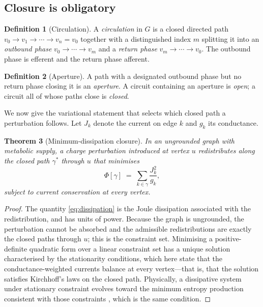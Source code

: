 \documentclass[11pt,twocolumn,a4paper]{article}
\theoremstyle{thmstyle}
\newtheorem{theorem}{Theorem}[section]
\theoremstyle{definition}
\newtheorem{definition}[theorem]{Definition}
\theoremstyle{remark}
\newcommand{\Gph}{G}
\begin{document}
\subsection{Closure is obligatory}

\begin{definition}[Circulation]
\label{def:circulation}
A \emph{circulation} in $\Gph$ is a closed directed path
$v_0\to v_1\to\cdots\to v_n=v_0$ together with a distinguished index $m$
splitting it into an \emph{outbound phase} $v_0\to\cdots\to v_m$ and a
\emph{return phase} $v_m\to\cdots\to v_0$. The outbound phase is efferent and
the return phase afferent.
\end{definition}

\begin{definition}[Aperture]
\label{def:aperture}
A path with a designated outbound phase but no return phase closing it is an
\emph{aperture}. A circuit containing an aperture is \emph{open}; a circuit
all of whose paths close is \emph{closed}.
\end{definition}

We now give the variational statement that selects which closed path a
perturbation follows. Let $J_k$ denote the current on edge $k$ and $g_k$ its
conductance.

\begin{theorem}[Minimum-dissipation closure]
\label{thm:min-dissipation}
In an ungrounded graph with metabolic supply, a charge perturbation introduced
at vertex $u$ redistributes along the closed path $\gamma^\ast$ through $u$
that minimises
\begin{equation}
\Phi[\gamma]\;=\;\sum_{k\in\gamma}\frac{J_k^{2}}{g_k},
\label{eq:dissipation}
\end{equation}
subject to current conservation at every vertex.
\end{theorem}

\begin{proof}
The quantity \eqref{eq:dissipation} is the Joule dissipation associated with
the redistribution, and has units of power. Because the graph is ungrounded,
the perturbation cannot be absorbed and the admissible redistributions are
exactly the closed paths through $u$; this is the constraint set. Minimising a
positive-definite quadratic form over a linear constraint set has a unique
solution characterised by the stationarity conditions, which here state that
the conductance-weighted currents balance at every vertex---that is, that the
solution satisfies Kirchhoff's laws on the closed path. Physically, a
dissipative system under stationary constraint evolves toward the minimum
entropy production consistent with those constraints \citep{onsager1931,%
nicolis1977}, which is the same condition.
\end{proof}
\end{document}
